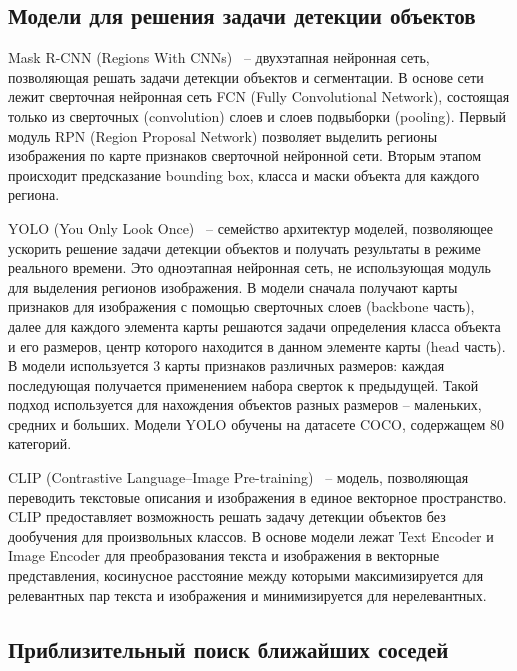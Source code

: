 \documentclass[a4paper,14pt]{article}
\begin{document}
    \subsection{Модели для решения задачи детекции объектов}

    Mask R-CNN (Regions With CNNs)~\cite{MaskRCNN} -- двухэтапная нейронная сеть, позволяющая решать задачи детекции объектов и сегментации. В основе сети лежит сверточная нейронная сеть FCN (Fully Convolutional Network), состоящая только из сверточных (convolution) слоев и слоев подвыборки (pooling). Первый модуль RPN (Region Proposal Network) позволяет выделить регионы изображения по карте признаков сверточной нейронной сети. Вторым этапом происходит предсказание bounding box, класса и маски объекта для каждого региона.

    YOLO (You Only Look Once)~\cite{redmon2016you} -- семейство архитектур моделей, позволяющее ускорить решение задачи детекции объектов и получать результаты в режиме реального времени.
    Это одноэтапная нейронная сеть, не использующая модуль для выделения регионов изображения.
    В модели сначала получают карты признаков для изображения с помощью сверточных слоев (backbone часть), далее для каждого элемента карты решаются задачи определения класса объекта и его размеров, центр которого находится в данном элементе карты (head часть).
    В модели используется 3 карты признаков различных размеров: каждая последующая получается применением набора сверток к предыдущей.
    Такой подход используется для нахождения объектов разных размеров -- маленьких, средних и больших.
    Модели YOLO обучены на датасете COCO, содержащем 80 категорий.

    CLIP (Contrastive Language–Image Pre-training)~\cite{CLIP} -- модель, позволяющая переводить текстовые описания и изображения в единое векторное пространство.
    CLIP предоставляет возможность решать задачу детекции объектов без дообучения для произвольных классов.
    В основе модели лежат Text Encoder и Image Encoder для преобразования текста и изображения в векторные представления, косинусное расстояние между которыми максимизируется для релевантных пар текста и изображения и минимизируется для нерелевантных.

    \subsection{Приблизительный поиск ближайших соседей}
\end{document}

